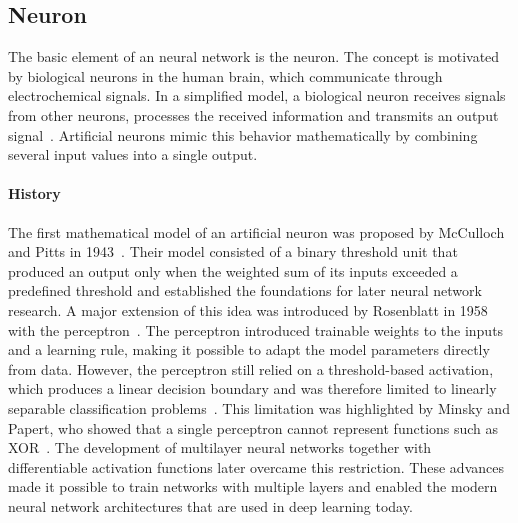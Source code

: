 \subsection{Neuron}
The basic element of an neural network is the neuron. The concept is motivated by biological neurons in the human brain, which communicate through electrochemical signals. In a simplified model, a biological neuron receives signals from other neurons, processes the received information and transmits an output signal~\cite{Lin2017ArtificialNN}. Artificial neurons mimic this behavior mathematically by combining several input values into a single output.

\paragraph{History}
The first mathematical model of an artificial neuron was proposed by McCulloch and Pitts in 1943~\cite{McCulloch1990ALC}. Their model consisted of a binary threshold unit that produced an output only when the weighted sum of its inputs exceeded a predefined threshold and established the foundations for later neural network research.
A major extension of this idea was introduced by Rosenblatt in 1958 with the perceptron~\cite{Rosenblatt1958ThePA}. The perceptron introduced trainable weights to the inputs and a learning rule, making it possible to adapt the model parameters directly from data. However, the perceptron still relied on a threshold-based activation, which produces a linear decision boundary and was therefore limited to linearly separable classification problems~\cite{Minsky1969AnIT}.
This limitation was highlighted by Minsky and Papert, who showed that a single perceptron cannot represent functions such as XOR~\cite{Minsky1969AnIT}. The development of multilayer neural networks together with differentiable activation functions later overcame this restriction. These advances made it possible to train networks with multiple layers and enabled the modern neural network architectures that are used in deep learning today.

